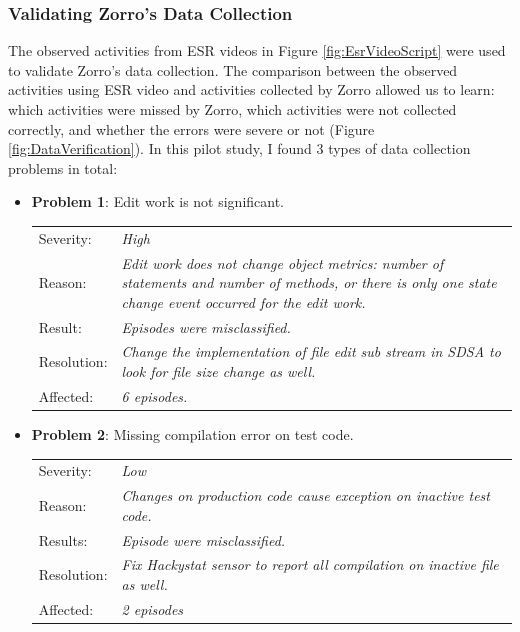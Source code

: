 \subsubsection{Validating Zorro's Data Collection}
The observed activities from ESR videos in Figure
\ref{fig:EsrVideoScript} were used to validate Zorro's data collection. The
comparison between the observed activities using ESR video and
activities collected by Zorro allowed us to learn: which activities
were missed by Zorro, which activities were not collected correctly,
and whether the errors were severe or not (Figure
\ref{fig:DataVerification}). In this pilot study, I found 3 types of
data collection problems in total:
\begin{itemize}
\item \textbf{Problem 1}: Edit work is not significant. 
  \begin{tabular}{lp{10cm}}
   Severity: &  \small\textit{High}\\
   Reason:   &  \small\textit{Edit work does not change object metrics: 
                         number of statements and number of methods, 
                         or there is only one state change event
                         occurred for the edit work.} \\ 
   Result:    & \small\textit{Episodes were misclassified.} \\ 
   Resolution: & \small\textit{Change the implementation of file edit 
                           sub stream in SDSA to look for file size 
                           change as well.} \\ 
   Affected: &  \small\textit{6 episodes.}
  \end{tabular}

\item \textbf{Problem 2}: Missing compilation error on test code.
  \begin{tabular}{lp{10cm}}
    Severity: & \small\textit{Low}\\
    Reason:   & \small\textit{Changes on production code cause 
                exception on inactive test code.} \\
    Results: & \small\textit{Episode were misclassified.} \\
    Resolution: & \small\textit{Fix Hackystat sensor to report all 
                  compilation on inactive file as well.}\\
    Affected: & \small\textit{2 episodes}
  \end{tabular}


\end{itemize}
